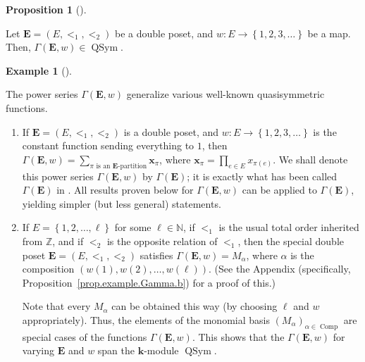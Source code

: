 \documentclass[numbers=enddot,12pt,final,onecolumn,notitlepage,abstracton]{scrartcl}
\theoremstyle{definition}
\newtheorem{prop}[theo]{Proposition}
\newenvironment{proposition}[1][]
{\begin{prop}[#1]\begin{leftbar}}
{\end{leftbar}\end{prop}}
\newtheorem{exam}[theo]{Example}
\newenvironment{example}[1][]
{\begin{exam}[#1]\begin{leftbar}}
{\end{leftbar}\end{exam}}
\let\sumnonlimits\sum
\let\prodnonlimits\prod
\renewcommand{\sum}{\sumnonlimits\limits}
\renewcommand{\prod}{\prodnonlimits\limits}
\newenvironment{verlong}{}{}
\newcommand{\kk}{{\mathbf{k}}}
\newcommand{\xx}{{\mathbf{x}}}
\newcommand{\Comp}{{\operatorname{Comp}}}
\newcommand{\QSym}{{\operatorname{QSym}}}
\newcommand{\EE}{{\mathbf{E}}}
\newcommand{\NN}{{\mathbb{N}}}
\newcommand{\ZZ}{{\mathbb{Z}}}
\begin{document}
\begin{proposition}
\label{prop.Gammaw.qsym}
Let $\EE = \left(E, <_1, <_2\right)$ be a double poset, and
$w : E \to \left\{1, 2, 3, \ldots\right\}$ be a map. Then,
$\Gamma\left(\EE , w\right) \in \QSym$.
\end{proposition}

\begin{example}
\label{exam.Gamma}
The power series $\Gamma\left(\EE , w\right)$ generalize various
well-known quasisymmetric functions.

\begin{enumerate}
\item[(a)] If $\EE = \left(E, <_1, <_2\right)$ is a double poset, and
$w : E \to \left\{1, 2, 3, \ldots\right\}$ is the constant
function sending everything to $1$, then
$\Gamma\left(\EE , w\right)
= \sum_{\pi\text{ is an }\EE\text{-partition}} \xx_{\pi}$,
where $\xx_{\pi} = \prod_{e \in E} x_{\pi\left(e\right)}$.
We shall denote this power series $\Gamma\left(\EE , w\right)$
by $\Gamma\left(\EE\right)$; it is exactly what has been called
$\Gamma\left(\EE\right)$ in \cite[\S 2.2]{Mal-Reu-DP}. All results
proven below for $\Gamma\left(\EE , w\right)$ can be applied to
$\Gamma\left(\EE\right)$, yielding simpler (but less general)
statements.

\item[(b)] If $E = \left\{1, 2, \ldots, \ell\right\}$ for some
$\ell \in \NN$, if $<_1$ is the usual total order inherited from
$\ZZ$, and if $<_2$ is the opposite relation of $<_1$, then the
special double poset $\EE = \left(E, <_1, <_2\right)$ satisfies
$\Gamma\left(\EE, w\right) = M_\alpha$, where $\alpha$ is the
composition $\left(w\left(1\right), w\left(2\right), \ldots,
w\left(\ell\right)\right)$.
\begin{verlong}
(See the Appendix
(specifically, Proposition~\ref{prop.example.Gamma.b})
for a proof of this.)
\end{verlong}

Note that every $M_\alpha$ can be obtained
this way (by choosing $\ell$ and $w$ appropriately).
Thus, the elements of the monomial
basis $\left(M_\alpha\right)_{\alpha \in \Comp}$ are special
cases of the functions $\Gamma\left(\EE, w\right)$.
This shows that
the $\Gamma\left(\EE, w\right)$ for varying $\EE$ and $w$
span the $\kk$-module $\QSym$.


\end{enumerate}
\end{example}
\end{document}

